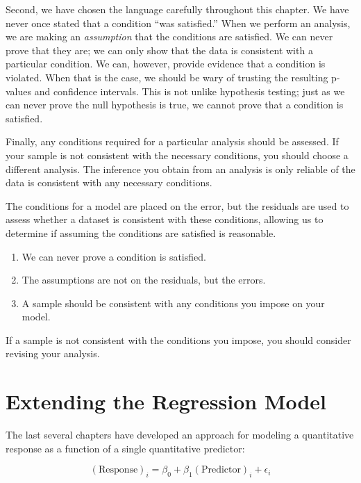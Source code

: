 \documentclass[
]{book}
\providecommand{\tightlist}{%
  \setlength{\itemsep}{0pt}\setlength{\parskip}{0pt}}
\theoremstyle{plain}
\theoremstyle{mydefn}
\theoremstyle{myexmpl}
\theoremstyle{remark}
\begin{document}
Second, we have chosen the language carefully throughout this chapter. We have never once stated that a condition ``was satisfied.'' When we perform an analysis, we are making an \emph{assumption} that the conditions are satisfied. We can never prove that they are; we can only show that the data is consistent with a particular condition. We can, however, provide evidence that a condition is violated. When that is the case, we should be wary of trusting the resulting p-values and confidence intervals. This is not unlike hypothesis testing; just as we can never prove the null hypothesis is true, we cannot prove that a condition is satisfied.

Finally, any conditions required for a particular analysis should be assessed. If your sample is not consistent with the necessary conditions, you should choose a different analysis. The inference you obtain from an analysis is only reliable of the data is consistent with any necessary conditions.

\begin{rmdtip}
The conditions for a model are placed on the error, but the residuals are used to assess whether a dataset is consistent with these conditions, allowing us to determine if assuming the conditions are satisfied is reasonable.

\begin{enumerate}
\def\labelenumi{\arabic{enumi}.}
\tightlist
\item
  We can never prove a condition is satisfied.
\item
  The assumptions are not on the residuals, but the errors.
\item
  A sample should be consistent with any conditions you impose on your model.
\end{enumerate}

If a sample is not consistent with the conditions you impose, you should consider revising your analysis.
\end{rmdtip}

\hypertarget{Regextensions}{%
\chapter{Extending the Regression Model}\label{Regextensions}}

The last several chapters have developed an approach for modeling a quantitative response as a function of a single quantitative predictor:

\[(\text{Response})_i = \beta_0 + \beta_1 (\text{Predictor})_i + \epsilon_i\]
\end{document}

